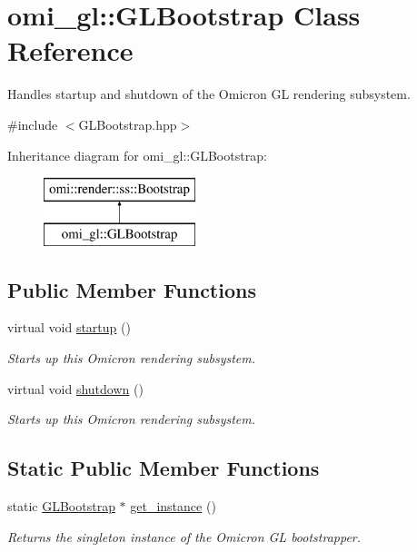 \hypertarget{classomi__gl_1_1_g_l_bootstrap}{}\section{omi\+\_\+gl\+:\+:G\+L\+Bootstrap Class Reference}
\label{classomi__gl_1_1_g_l_bootstrap}


Handles startup and shutdown of the Omicron GL rendering subsystem.  




{\ttfamily \#include $<$G\+L\+Bootstrap.\+hpp$>$}

Inheritance diagram for omi\+\_\+gl\+:\+:G\+L\+Bootstrap\+:\begin{figure}[H]
\begin{center}
\leavevmode
\includegraphics[height=2.000000cm]{classomi__gl_1_1_g_l_bootstrap}
\end{center}
\end{figure}
\subsection*{Public Member Functions}
\begin{DoxyCompactItemize}
\item 
virtual void \hyperlink{classomi__gl_1_1_g_l_bootstrap_a2cb4f9ea291138b1fb0943a6957f89c5}{startup} ()
\begin{DoxyCompactList}\small\item\em Starts up this Omicron rendering subsystem. \end{DoxyCompactList}\item 
virtual void \hyperlink{classomi__gl_1_1_g_l_bootstrap_ae086f372b2f8e5b56087bb28c4310d14}{shutdown} ()
\begin{DoxyCompactList}\small\item\em Starts up this Omicron rendering subsystem. \end{DoxyCompactList}\end{DoxyCompactItemize}
\subsection*{Static Public Member Functions}
\begin{DoxyCompactItemize}
\item 
static \hyperlink{classomi__gl_1_1_g_l_bootstrap}{G\+L\+Bootstrap} $\ast$ \hyperlink{classomi__gl_1_1_g_l_bootstrap_a953189805951f06b681396675965bb12}{get\+\_\+instance} ()\hypertarget{classomi__gl_1_1_g_l_bootstrap_a953189805951f06b681396675965bb12}{}\label{classomi__gl_1_1_g_l_bootstrap_a953189805951f06b681396675965bb12}

\begin{DoxyCompactList}\small\item\em Returns the singleton instance of the Omicron GL bootstrapper. \end{DoxyCompactList}\end{DoxyCompactItemize}
